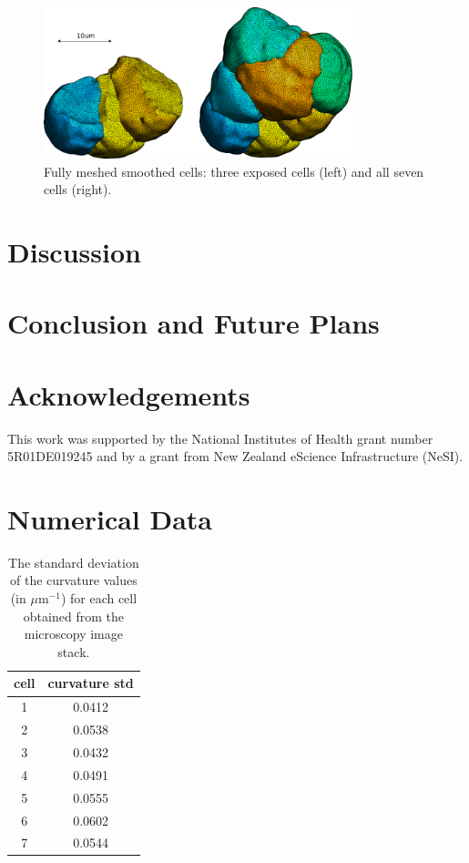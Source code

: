\documentclass[a4paper,10pt]{article}
\begin{document}
\begin{figure}[H]
\begin{center}
\includegraphics[width=0.8\textwidth]{images/smooth.pdf}
\end{center}
\caption{Fully meshed smoothed cells: three exposed cells (left) and all seven cells (right).}
\label{fig:smooth}
\end{figure}

\section{Discussion}

\section{Conclusion and Future Plans}

\section{Acknowledgements}
This work was supported by the National Institutes of Health grant number 5R01DE019245 and by a grant from New Zealand eScience Infrastructure (NeSI).\\




\pagebreak
\appendix

\section{Numerical Data}

\begin{table}[H]
\begin{center}
\footnotesize
\begin{tabular}{|c|c|}
\hline
cell &curvature std\\
\hline
1 &0.0412\\
2 &0.0538\\
3 & 0.0432\\
4 &0.0491\\
5 &0.0555\\
6 &0.0602\\
7 &0.0544\\
\hline
\end{tabular}
\end{center}
\caption{The standard deviation of the curvature values (in $\mu \text{m}^{-1}$) for each cell obtained from the microscopy image stack.}
\label{tab:ref_curv}
\end{table}
\end{document}
